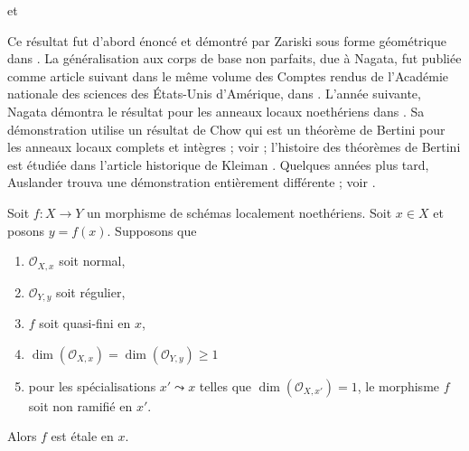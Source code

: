 \begin{lemma}
\label{lemma-purity}
\begin{reference}
\cite{Nagata-Purity} et \cite[Exp. X, Thm. 3.1]{SGA1}
\end{reference}
\begin{history}
Ce résultat fut d'abord énoncé et démontré par Zariski sous
forme géométrique dans \cite{Zariski-Purity}.
La généralisation aux corps de base non parfaits, due à Nagata,
fut publiée comme article suivant dans le même volume des
Comptes rendus de l'Académie nationale des sciences des États-Unis d'Amérique,
dans \cite{Nagata-Remarks-Purity}. L'année suivante, Nagata
démontra le résultat pour les anneaux locaux noethériens dans \cite{Nagata-Purity}.
Sa démonstration utilise un résultat de Chow qui est un théorème de Bertini pour les
anneaux locaux complets et intègres ; voir \cite{Chow-Bertini} ;
l'histoire des théorèmes de Bertini est étudiée dans
l'article historique de Kleiman \cite{Kleiman-Bertini}.
Quelques années plus tard, Auslander trouva une démonstration entièrement différente ;
voir \cite{Auslander-Purity}.
\end{history}
Soit $f : X \to Y$ un morphisme de schémas localement noethériens.
Soit $x \in X$ et posons $y = f(x)$. Supposons que
\begin{enumerate}
\item $\mathcal{O}_{X, x}$ soit normal,
\item $\mathcal{O}_{Y, y}$ soit régulier,
\item $f$ soit quasi-fini en $x$,
\item $\dim(\mathcal{O}_{X, x}) = \dim(\mathcal{O}_{Y, y}) \geq 1$
\item pour les spécialisations $x' \leadsto x$ telles que
$\dim(\mathcal{O}_{X, x'}) = 1$, le morphisme $f$ soit non ramifié en $x'$.
\end{enumerate}
Alors $f$ est étale en $x$.
\end{lemma}

